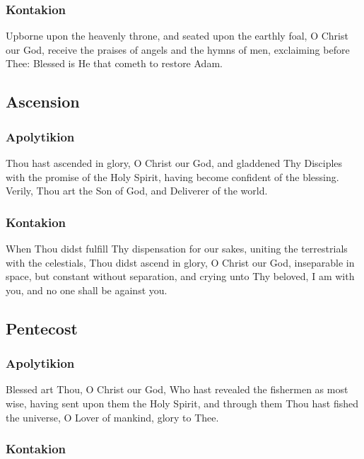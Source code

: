 \subsubsection{Kontakion}

 Upborne upon the heavenly throne, and seated upon the earthly foal, O Christ our God, receive the praises of angels and the hymns of men, exclaiming before Thee: Blessed is He that cometh to restore Adam.

\subsection{Ascension}

\subsubsection{Apolytikion}

 Thou hast ascended in glory, O Christ our God, and gladdened Thy Disciples with the promise of the Holy Spirit, having become confident of the blessing. Verily, Thou art the Son of God, and Deliverer of the world.

\subsubsection{Kontakion}

 When Thou didst fulfill Thy dispensation for our sakes, uniting the terrestrials with the celestials, Thou didst ascend in glory, O Christ our God, inseparable in space, but constant without separation, and crying unto Thy beloved, I am with you, and no one shall be against you.

\subsection{Pentecost}

\subsubsection{Apolytikion}

 Blessed art Thou, O Christ our God, Who hast revealed the fishermen as most wise, having sent upon them the Holy Spirit, and through them Thou hast fished the universe, O Lover of mankind, glory to Thee.

\subsubsection{Kontakion}

